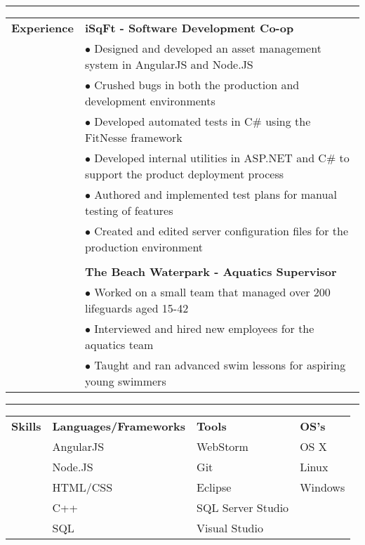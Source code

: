 \documentclass[11pt]{article} %
\begin{document}
\begin{small}
			\vspace*{1\baselineskip}\hrule\vspace*{1\baselineskip}		
	\begin{tabular}[t]{p{3cm} p{16cm}}\large{\textbf{Experience}} 	
	  			& \textbf{iSqFt - Software Development Co-op} \color{gray}{Spring/Fall 2013, and Summer 2014}  \\
 	  			& $\bullet$ Designed and developed an asset management system in AngularJS and Node.JS \\
 	  			& $\bullet$ Crushed bugs in both the production and development environments \\
 	  			& $\bullet$ Developed automated tests in C\# using the FitNesse framework		\\
 	  			& $\bullet$ Developed internal utilities in ASP.NET and C\# to support the product deployment process \\ 
 	  			& $\bullet$ Authored and implemented test plans for manual testing of features			\\
 	  			& $\bullet$ Created and edited server configuration files for the production environment \\
 	  			& \\
 	  			& \textbf{The Beach Waterpark - Aquatics Supervisor} \color{gray}{Summers 2008 - 2011} \\
 	  			& $\bullet$ Worked on a small team that managed over 200 lifeguards aged 15-42 \\
 	  			& $\bullet$ Interviewed and hired new employees for the aquatics team \\
 	  			& $\bullet$ Taught and ran advanced swim lessons for aspiring young swimmers \\
			\end{tabular}
			\vspace*{1\baselineskip}\hrule\vspace*{1\baselineskip}
			\begin{tabular}[t]{p{3cm}p{4cm}p{5cm}p{4cm}}\large{\textbf{Skills}} 	
				& \textbf{Languages/Frameworks}	& \textbf{Tools}& \textbf{OS's} \\ 
				& AngularJS 				& WebStorm 			& OS X 	\\
				& Node.JS				& Git					&   Linux	  	\\
				& HTML/CSS				& Eclipse 				&Windows	 	\\
				& C++					& SQL Server Studio 	& 		\\
				& SQL					& Visual Studio			& 			\\
				

\end{tabular}
\end{small}
\end{document}
